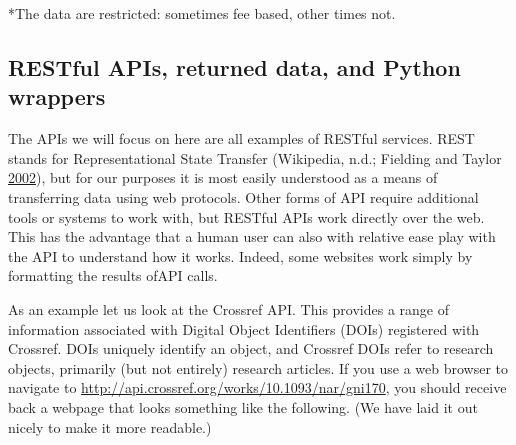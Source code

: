 \documentclass[]{krantz}
\begin{document}
*The data are restricted: sometimes fee based, other times not.

\subsection{RESTful APIs, returned data, and Python
wrappers}\label{restful-apis-returned-data-and-python-wrappers}

The APIs we will focus on here are all examples of RESTful services.
REST stands for Representational State Transfer (Wikipedia, n.d.;
Fielding and Taylor
\protect\hyperlink{ref-fielding2002principled}{2002}), but for our
purposes it is most easily understood as a means of transferring data
using web protocols. Other forms of API require additional tools or
systems to work with, but RESTful APIs work directly over the web. This
has the advantage that a human user can also with relative ease play
with the API to understand how it works. Indeed, some websites work
simply by formatting the results ofAPI calls.

As an example let us look at the Crossref API. This provides a range of
information associated with Digital Object Identifiers (DOIs) registered
with Crossref. DOIs uniquely identify an object, and Crossref DOIs refer
to research objects, primarily (but not entirely) research articles. If
you use a web browser to navigate to
\url{http://api.crossref.org/works/10.1093/nar/gni170}, you should
receive back a webpage that looks something like the following. (We have
laid it out nicely to make it more readable.)
\end{document}
